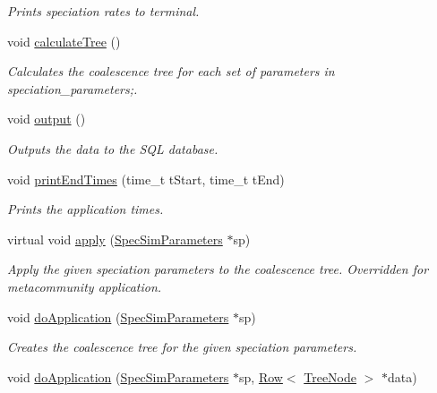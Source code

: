 \begin{DoxyCompactItemize}
\begin{DoxyCompactList}\small\item\em Prints speciation rates to terminal. \end{DoxyCompactList}\item 
void \hyperlink{class_community_adfa9a1c84bb326092805614ad195fcdd}{calculate\+Tree} ()\hypertarget{class_community_adfa9a1c84bb326092805614ad195fcdd}{}\label{class_community_adfa9a1c84bb326092805614ad195fcdd}

\begin{DoxyCompactList}\small\item\em Calculates the coalescence tree for each set of parameters in speciation\+\_\+parameters;. \end{DoxyCompactList}\item 
void \hyperlink{class_community_ad2483623c7ad7a11564fc49305204585}{output} ()
\begin{DoxyCompactList}\small\item\em Outputs the data to the S\+QL database. \end{DoxyCompactList}\item 
void \hyperlink{class_community_a36216913433e3e011ee2420e83e1fe4a}{print\+End\+Times} (time\+\_\+t t\+Start, time\+\_\+t t\+End)
\begin{DoxyCompactList}\small\item\em Prints the application times. \end{DoxyCompactList}\item 
virtual void \hyperlink{class_community_ac1dee14af27a0add712e257e316cadbf}{apply} (\hyperlink{struct_spec_sim_parameters}{Spec\+Sim\+Parameters} $\ast$sp)
\begin{DoxyCompactList}\small\item\em Apply the given speciation parameters to the coalescence tree. Overridden for metacommunity application. \end{DoxyCompactList}\item 
void \hyperlink{class_community_a8ce443a30731d2249852d2b615f4a29a}{do\+Application} (\hyperlink{struct_spec_sim_parameters}{Spec\+Sim\+Parameters} $\ast$sp)
\begin{DoxyCompactList}\small\item\em Creates the coalescence tree for the given speciation parameters. \end{DoxyCompactList}\item 
void \hyperlink{class_community_a7289dd39ee9b69ca314e1752a7b45701}{do\+Application} (\hyperlink{struct_spec_sim_parameters}{Spec\+Sim\+Parameters} $\ast$sp, \hyperlink{class_row}{Row}$<$ \hyperlink{class_tree_node}{Tree\+Node} $>$ $\ast$data)

\end{DoxyCompactItemize}
